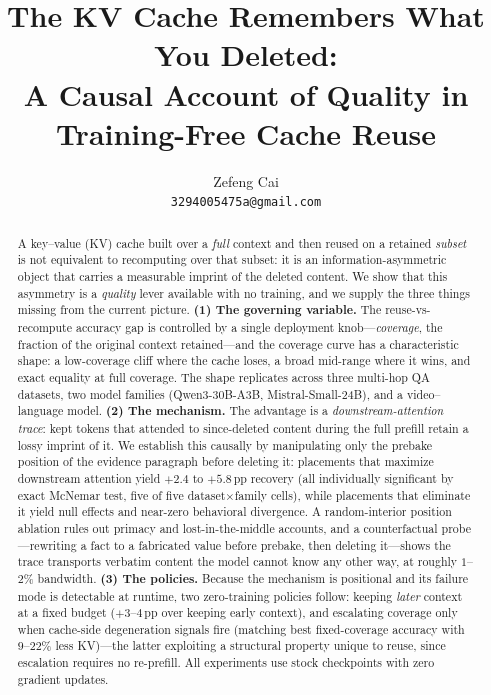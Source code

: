 \documentclass{article} %
\title{The KV Cache Remembers What You Deleted:\\
A Causal Account of Quality in Training-Free Cache Reuse}
\author{Zefeng Cai\\
\texttt{3294005475a@gmail.com}}
\newcommand{\pp}{\,\mathrm{pp}}
\begin{document}
\maketitle
{}

\begin{abstract}
A key--value (KV) cache built over a \emph{full} context and then reused on a retained \emph{subset} is not equivalent to recomputing over that subset: it is an information-asymmetric object that carries a measurable imprint of the deleted content. We show that this asymmetry is a \emph{quality} lever available with no training, and we supply the three things missing from the current picture. \textbf{(1) The governing variable.} The reuse-vs-recompute accuracy gap is controlled by a single deployment knob---\emph{coverage}, the fraction of the original context retained---and the coverage curve has a characteristic shape: a low-coverage cliff where the cache loses, a broad mid-range where it wins, and exact equality at full coverage. The shape replicates across three multi-hop QA datasets, two model families (Qwen3-30B-A3B, Mistral-Small-24B), and a video--language model. \textbf{(2) The mechanism.} The advantage is a \emph{downstream-attention trace}: kept tokens that attended to since-deleted content during the full prefill retain a lossy imprint of it. We establish this causally by manipulating only the prebake position of the evidence paragraph before deleting it: placements that maximize downstream attention yield $+2.4$ to $+5.8\pp$ recovery (all individually significant by exact McNemar test, five of five dataset$\times$family cells), while placements that eliminate it yield null effects and near-zero behavioral divergence. A random-interior position ablation rules out primacy and lost-in-the-middle accounts, and a counterfactual probe---rewriting a fact to a fabricated value before prebake, then deleting it---shows the trace transports verbatim content the model cannot know any other way, at roughly $1$--$2\%$ bandwidth. \textbf{(3) The policies.} Because the mechanism is positional and its failure mode is detectable at runtime, two zero-training policies follow: keeping \emph{later} context at a fixed budget ($+3$--$4\pp$ over keeping early context), and escalating coverage only when cache-side degeneration signals fire (matching best fixed-coverage accuracy with $9$--$22\%$ less KV)---the latter exploiting a structural property unique to reuse, since escalation requires no re-prefill. All experiments use stock checkpoints with zero gradient updates.
\end{abstract}
\end{document}
